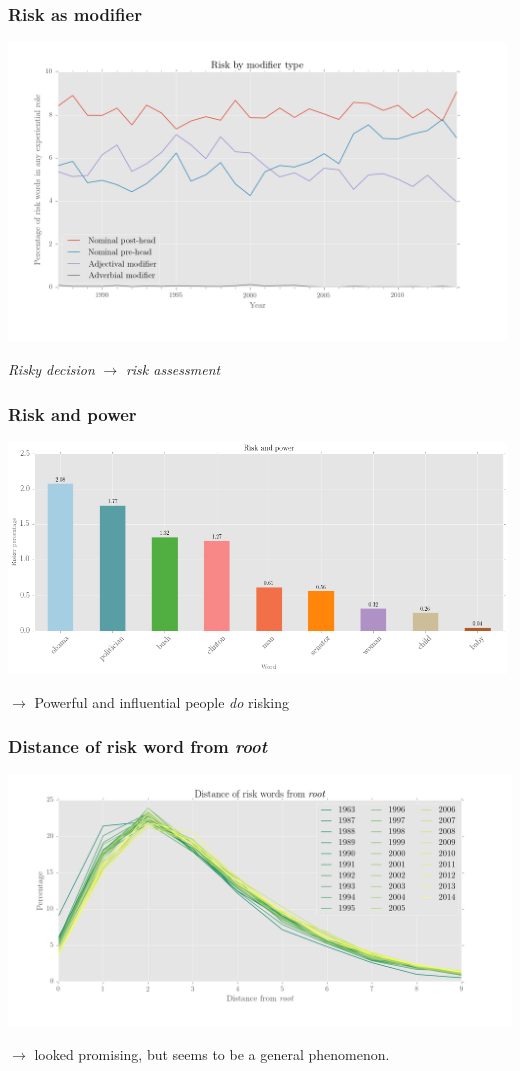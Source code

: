 \documentclass{beamer}       %
\begin{document}
\begin{frame}
    \frametitle{Risk as modifier}
    \centering
    \includegraphics[width=0.99\textwidth]{../../images/risk_by_mod_type_colour}

    \noindent \emph{Risky decision} $\rightarrow$ \emph{risk assessment}
\end{frame}

\begin{frame}
    \frametitle{Risk and power}
    \centering
    \includegraphics[width=0.99\textwidth]{../../images/risk-and-power-2}

    $\rightarrow$ Powerful and influential people \emph{do} risking

\end{frame}

\begin{frame}
    \frametitle{Distance of risk word from \emph{root}}
    \centering
    \includegraphics[width=1\textwidth]{../../images/distance-of-risk-words-from-root}

    $\rightarrow$ looked promising, but seems to be a general phenomenon.
\end{frame}
\end{document}
